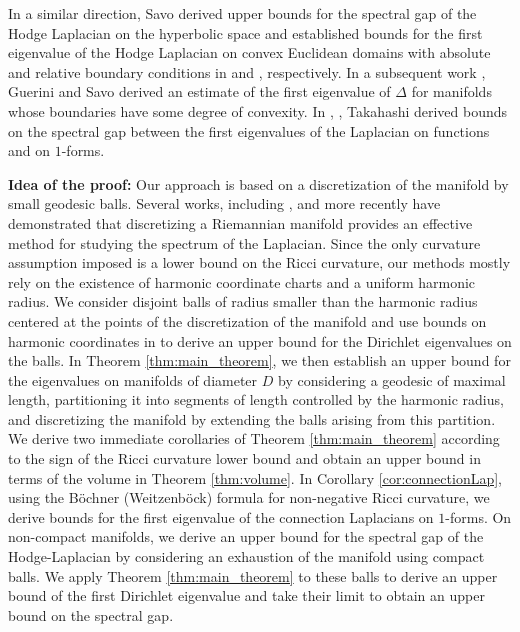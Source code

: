 \documentclass[10 pt, reqno]{amsart}
\begin{document}
In a similar direction, Savo derived upper bounds for the spectral gap of the Hodge Laplacian on the hyperbolic space and established bounds for the first eigenvalue of the Hodge Laplacian on convex Euclidean domains with absolute and relative boundary conditions in \cite{savo09} and \cite{savo2002}, respectively. In a subsequent work \cite{guerinisavo2004}, Guerini and Savo derived an estimate of the first eigenvalue of $\Delta$ for manifolds whose boundaries have some degree of convexity.   In \cite{takahashi2001}, \cite{takahashi2003}, Takahashi derived bounds on the spectral gap between the first eigenvalues of the Laplacian on functions and on $1$-forms.


\par \textbf{Idea of the proof:}  Our approach is based on a discretization of the manifold by small geodesic balls.  Several works, including \cite{ burago, belkin, Tatiana}, and more recently \cite{MaityBhattacharya2026} have demonstrated that discretizing a Riemannian manifold provides an effective method for studying the spectrum of the Laplacian.   Since the only curvature assumption imposed is a lower bound on the Ricci curvature, our methods mostly rely on the existence of harmonic coordinate charts and a uniform harmonic radius. We consider disjoint balls of radius smaller than the harmonic radius centered at the points of the discretization of the manifold and use bounds on harmonic coordinates in  \cite{CheegerAnderson} to derive an upper bound for the Dirichlet eigenvalues on the balls. In Theorem \ref{thm:main_theorem}, we then establish an upper bound for the eigenvalues on manifolds of diameter $D$ by considering a geodesic of maximal length, partitioning it into segments of length controlled by the harmonic radius, and discretizing the manifold by extending the balls arising from this partition. We derive two immediate corollaries of Theorem \ref{thm:main_theorem}  according to the sign of the Ricci curvature lower bound and obtain an upper bound in terms of the volume in Theorem \ref{thm:volume}. In Corollary \ref{cor:connectionLap}, using the B\"ochner (Weitzenb\"ock) formula for non-negative Ricci curvature, we derive bounds for the first eigenvalue of the connection Laplacians on $1$-forms. 
On non-compact manifolds, we derive an upper bound for the spectral gap of the Hodge-Laplacian by considering an exhaustion of the manifold using compact balls. We apply Theorem \ref{thm:main_theorem} to these balls to derive an upper bound of the first Dirichlet eigenvalue and take their limit to obtain an upper bound on the spectral gap.
 
\end{document}
